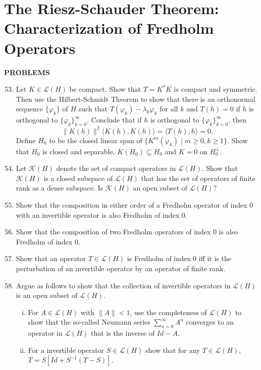 \section{The Riesz-Schauder Theorem: Characterization of Fredholm Operators}
\begin{center}
	\textbf{PROBLEMS}
\end{center}
\begin{enumerate}
	\setcounter{enumi}{52}
    \item Let $K\in\mathcal{L}(H)$ be compact.
    Show that $T=K^*K$ is compact and symmetric.
    Then use the Hilbert-Schmidt Theorem to show that there is an orthonormal sequence $\{\varphi_k\}$ of $H$ such that $T(\varphi_k)-\lambda_k\varphi_k$ for all $k$ and $T(h)=0$ if $h$ is orthogonal to $\{\varphi_k\}_{k=0}^\infty$.
    Conclude that if $h$ is orthogonal to $\{\varphi_k\}_{k=0}^\infty$, then
    \[
        \|K(h)\|^2\langle K(h),K(h)\rangle=\langle T(h),h\rangle=0.
    \]
    Define $H_0$ to be the closed linear span of $\{K^m(\varphi_k)\mid m\ge0,k\ge1\}$.
    Show that $H_0$ is closed and separable, $K(H_0)\subseteq H_0$ and $K=0$ on $H_0^\perp$.
    \item Let $\mathcal{K}(H)$ denote the set of compact operators in $\mathcal{L}(H)$.
    Show that $\mathcal{K}(H)$ is a closed subspace of $\mathcal{L}(H)$ that has the set of operators of finite rank as a dense subspace.
    Is $\mathcal{K}(H)$ an open subset of $\mathcal{L}(H)$?
    \item Show that the composition in either order of a Fredholm operator of index $0$ with an invertible operator is also Fredholm of index $0$.
    \item Show that the composition of two Fredholm operators of index $0$ is also Fredholm of index $0$.
    \item Show that an operator $T\in\mathcal{L}(H)$ is Fredholm of index $0$ iff it is the perturbation of an invertible operator by an operator of finite rank.
    \item Argue as follows to show that the collection of invertible operators in $\mathcal{L}(H)$ is an open subset of $\mathcal{L}(H)$.
    \begin{enumerate}[(i)]
        \item For $A\in\mathcal{L}(H)$ with $\|A\|<1$, use the completeness of $\mathcal{L}(H)$ to show that the so-called Neumann series $\sum_{n=0}^\infty A^n$ converges to an operator in $\mathcal{L}(H)$ that is the inverse of $Id-A$.
        \item For a invertible operator $S\in\mathcal{L}(H)$ show that for any $T\in\mathcal{L}(H)$, $T=S[Id+S^{-1}(T-S)]$.

\end{enumerate}
\end{enumerate}
